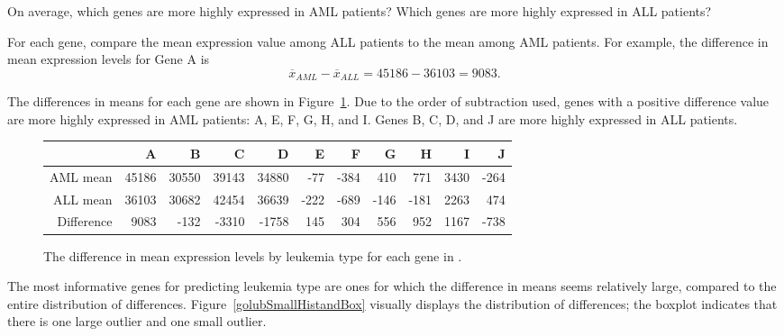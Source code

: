 \begin{examplewrap}
\begin{nexample}{On average, which genes are more highly expressed in AML patients? Which genes are more highly expressed in ALL patients?}

For each gene, compare the mean expression value among ALL patients to the mean among AML patients. For example, the difference in mean expression levels for Gene A is
\[\overline{x}_{AML} - \overline{x}_{ALL} = 45186 - 36103 = 9083. \]	

The differences in means for each gene are shown in Figure~\ref{golubSmallDiffinMeans}. Due to the order of subtraction used, genes with a positive difference value are more highly expressed in AML patients: A, E, F, G, H, and I. Genes B, C, D, and J are more highly expressed in ALL patients. 
\end{nexample}
\end{examplewrap}

\begin{figure}[ht]
	\centering
	\footnotesize
	\begin{tabular}{rrrrrrrrrrr}
		\hline
		& A & B & C & D & E & F & G & H & I & J \\ 
		\hline
		AML mean & 45186 & 30550 & 39143 & 34880 & -77 & -384 & 410 & 771 & 3430 & -264 \\ 
		ALL mean & 36103 & 30682 & 42454 & 36639 & -222 & -689 & -146 & -181 & 2263 & 474 \\ 
		\hline
		Difference & 9083 & -132 & -3310 & -1758 & 145 & 304 & 556 & 952 & 1167 & -738 \\ 
		\hline
	\end{tabular}
	\caption{The difference in mean expression levels by leukemia type for each gene in .}
	\label{golubSmallDiffinMeans}
\end{figure}

\textD{\newpage}

The most informative genes for predicting leukemia type are ones for which the difference in means seems relatively large, compared to the entire distribution of differences. Figure~\ref{golubSmallHistandBox} visually displays the distribution of differences; the boxplot indicates that there is one large outlier and one small outlier.  

